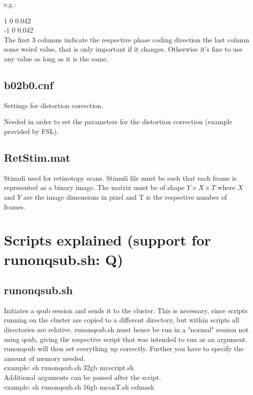 \documentclass[12pt,a4paper]{scrartcl}
\begin{document}
\noindent e.g.:

 1 0 0.042\\
 -1 0 0.042\\

The first 3 columns indicate the respective phase coding direction the last column some weird value, that is only important if it changes. Otherwise it's fine to use any value as long as it is the same.

\subsection{b02b0.cnf}
Settings for distortion correction.

Needed in order to set the parameters for the distortion correction (example provided by FSL).

\subsection{RetStim.mat}
Stimuli used for retinotopy scans. Stimuli file must be such that each frame is represented as a binary image. The matrix must be of shape $Y \times X \times T$ where $X$ and $Y$ are the image dimensions in pixel and T is the respective number of frames. 

\section{Scripts explained (support for runonqsub.sh: Q)}
\subsection{runonqsub.sh}
Initiates a qsub session and sends it to the cluster. This is necessary, since scripts running on the cluster are copied to a different directory, but within scripts all directories are relative. runonqsub.sh must hence be run in a "normal" session not using qsub, giving the respective script that was intended to run as an argument. runonqsub will then set everything up correctly. Further you have to specify the amount of memory needed.\\

example: sh runonqsub.sh 32gb myscript.sh\\

Additional arguments can be passed after the script.\\

example: sh runonqsub.sh 16gb meanT.sh csfmask\\
\end{document}
